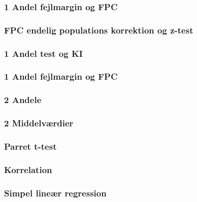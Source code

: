 \documentclass[]{book}
\begin{document}
\hypertarget{andel-fejlmargin-og-fpc}{%
\subsubsection{1 Andel fejlmargin og FPC}\label{andel-fejlmargin-og-fpc}}

\hypertarget{fpc-endelig-populations-korrektion-og-z-test}{%
\subsubsection{FPC endelig populations korrektion og z-test}\label{fpc-endelig-populations-korrektion-og-z-test}}

\hypertarget{andel-test-og-ki-1}{%
\subsubsection{1 Andel test og KI}\label{andel-test-og-ki-1}}

\hypertarget{andel-fejlmargin-og-fpc-1}{%
\subsubsection{1 Andel fejlmargin og FPC}\label{andel-fejlmargin-og-fpc-1}}

\hypertarget{andele}{%
\subsubsection{2 Andele}\label{andele}}

\hypertarget{middelvrdier}{%
\subsubsection{2 Middelværdier}\label{middelvrdier}}

\hypertarget{parret-t-test}{%
\subsubsection{Parret t-test}\label{parret-t-test}}

\hypertarget{korrelation}{%
\subsubsection{Korrelation}\label{korrelation}}

\hypertarget{simpel-liner-regression}{%
\subsubsection{Simpel lineær regression}\label{simpel-liner-regression}}
\end{document}
